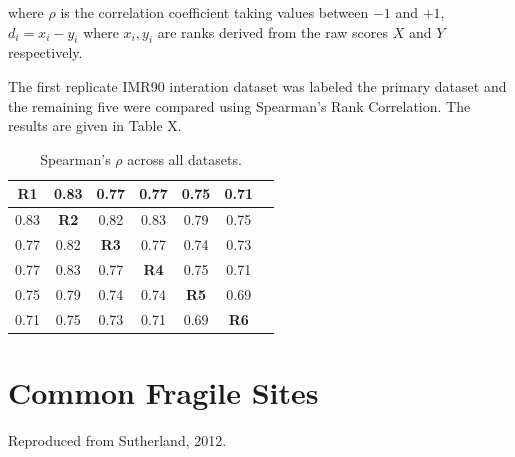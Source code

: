 \documentclass[phd,tocprelim]{cornell}
\begin{document}
where $\rho$ is the correlation coefficient taking values between $-1$ and $+1$,
$d_i = x_i - y_i$ where $x_i, y_i$ are ranks derived from the raw scores $X$ and
$Y$ respectively.

The first replicate IMR90 interation dataset was labeled the primary dataset
and the remaining five were compared using Spearman's Rank Correlation.  The
results are given in Table X.

\begin{table}
  \begin{tabular}{|c|*{6}{c|}}
    \toprule
    \textbf{R1} & 0.83 & 0.77 & 0.77 & 0.75 & 0.71 \\ \midrule
    0.83 & \textbf{R2} & 0.82 & 0.83 & 0.79 & 0.75 \\ \midrule
    0.77 & 0.82 & \textbf{R3} & 0.77 & 0.74 & 0.73 \\ \midrule
    0.77 & 0.83 & 0.77 & \textbf{R4} & 0.75 & 0.71 \\ \midrule
    0.75 & 0.79 & 0.74 & 0.74 & \textbf{R5} & 0.69 \\ \midrule
    0.71 & 0.75 & 0.73 & 0.71 & 0.69 & \textbf{R6} \\ \midrule
  \end{tabular}
  \caption{Spearman's $\rho$ across all datasets.}
\label{tab:correlations}
\end{table}

\chapter{Common Fragile Sites}
Reproduced from Sutherland, 2012\cite{sutherland2001}.

\end{document}

